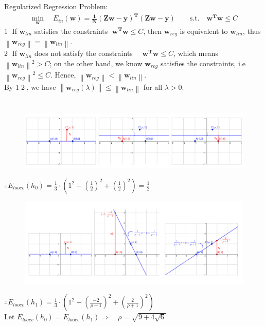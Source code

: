 \documentclass[a4paper,12pt]{article}
\begin{document}
\section {}
Regularized Regression Problem:
\begin{align*} 
  \min_{\mathbf{w}}  \quad E_{in}(\mathbf{w})= \mathbf{\frac{1}{N} (Zw-y)^{T} (Zw-y)   } \quad \quad
   \text{s.t.} \quad \mathbf{ w^T w } \leq C
\end{align*}
\textcircled{1} If $\mathbf{w}_{lin}$ satisfies the constraints $ \; \mathbf{ w^T w } \leq C$, then $\mathbf{w}_{reg}$ is equivalent to $\mathbf{w}_{lin}$, thus $\left \| \mathbf{w}_{reg} \right \| = \left \| \mathbf{w}_{lin} \right \|$. \\
\textcircled{2} If $\mathbf{w}_{lin}$ does not satisfy the constraints $\quad \mathbf{ w^T w } \leq C$, which means $\left \| \mathbf{w}_{lin} \right \|^2 > C$; on the other hand, we know $\mathbf{w}_{reg}$ satisfies the constraints, i.e $\left \| \mathbf{w}_{reg} \right \|^2 \leq C$. Hence, $\left \| \mathbf{w}_{reg} \right \| < \left \| \mathbf{w}_{lin} \right \|$.\\
By \textcircled{1}{\MaQ{}}\textcircled{2}, we have $\left \| \mathbf{w}_{reg}(\lambda) \right \| \leq \left \| \mathbf{w}_{lin} \right \|$ for all $\lambda > 0$.


\section{}
\begin{figure}[h]
\centering
\includegraphics[scale=0.48]{Q41.png}
\end{figure}
 $\displaystyle \therefore E_{loocv}(h_{0})=\frac{1}{3} \cdot (1^2 + (\frac{1}{2})^2 + (\frac{1}{2})^2)= \frac{1}{2}$ \\

\begin{figure}[h]
\centering
\includegraphics[scale=0.48]{Q42.png}
\end{figure}
 $\displaystyle \therefore E_{loocv}(h_{1})=\frac{1}{3} \cdot (1^2 + (\frac{-2}{\rho-1})^2 + (\frac{2}{\rho+1})^2)$ \\
 \newline
 Let $\displaystyle E_{loocv}(h_{0})=E_{loocv}(h_{1}) \Rightarrow \quad \rho=\sqrt{9+4 \sqrt{6}}$
\end{document}
